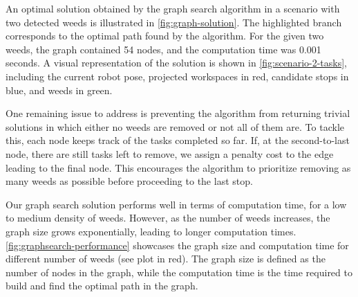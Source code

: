 An optimal solution obtained by the graph search algorithm in a scenario with two detected weeds is illustrated in \autoref{fig:graph-solution}. The highlighted branch corresponds to the optimal path found by the algorithm. For the given two weeds, the graph contained 54 nodes, and the computation time was 0.001 seconds. A visual representation of the solution is shown in \autoref{fig:scenario-2-tasks}, including the current robot pose, projected workspaces in red, candidate stops in blue, and weeds in green.

One remaining issue to address is preventing the algorithm from returning trivial solutions in which either no weeds are removed or not all of them are. To tackle this, each node keeps track of the tasks completed so far. If, at the second-to-last node, there are still tasks left to remove, we assign a penalty cost to the edge leading to the final node. This encourages the algorithm to prioritize removing as many weeds as possible before proceeding to the last stop.

Our graph search solution performs well in terms of computation time, for a low to medium density of weeds. However, as the number of weeds increases, the graph size grows exponentially, leading to longer computation times. \autoref{fig:graphsearch-performance} showcases the graph size and computation time for different number of weeds (see plot in red). The graph size is defined as the number of nodes in the graph, while the computation time is the time required to build and find the optimal path in the graph.

